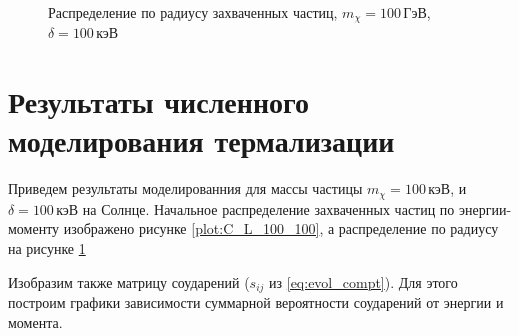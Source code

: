 \begin{figure}[!h]
	\begin{center}
		\caption{Распределение по радиусу захваченных частиц, $m_{\chi} = 100 \,  \text{ГэВ}$, $\delta = 100 \, \text{кэВ}$}
		\label{plot:r_distrib_100_100}
	\end{center}	
\end{figure}

\section{Результаты численного моделирования термализации}

Приведем результаты моделированния для массы частицы $m_{\chi} = 100 \, \text{кэВ}$, и $\delta = 100 \, \text{кэВ}$ на Солнце. Начальное распределение захваченных частиц по энергии-моменту изображено рисунке \ref{plot:C_L_100_100}, а распределение по радиусу на рисунке \ref{plot:r_distrib_100_100}

Изобразим также матрицу соударений ($s_{ij}$ из \ref{eq:evol_compt}). Для этого построим графики зависимости суммарной вероятности соударений от энергии и момента.


